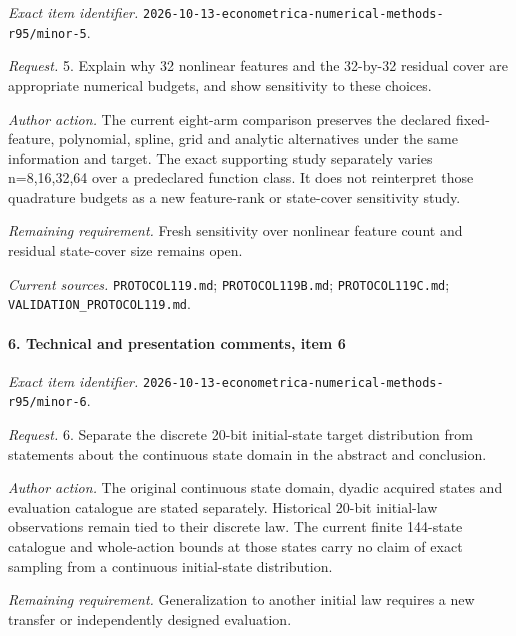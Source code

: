 \emph{Exact item identifier.} \nolinkurl{2026-10-13-econometrica-numerical-methods-r95/minor-5}.

\par\emph{Request.} 5. Explain why 32 nonlinear features and the 32-by-32 residual cover are appropriate numerical budgets, and show sensitivity to these choices.

\par\emph{Author action.} The current eight-arm comparison preserves the declared fixed-feature, polynomial, spline, grid and analytic alternatives under the same information and target. The exact supporting study separately varies n=8,16,32,64 over a predeclared function class. It does not reinterpret those quadrature budgets as a new feature-rank or state-cover sensitivity study.

\par\emph{Remaining requirement.} Fresh sensitivity over nonlinear feature count and residual state-cover size remains open.

\par\emph{Current sources.} \nolinkurl{PROTOCOL119.md}; \nolinkurl{PROTOCOL119B.md}; \nolinkurl{PROTOCOL119C.md}; \nolinkurl{VALIDATION_PROTOCOL119.md}.

\paragraph{6. Technical and presentation comments, item 6}

\emph{Exact item identifier.} \nolinkurl{2026-10-13-econometrica-numerical-methods-r95/minor-6}.

\par\emph{Request.} 6. Separate the discrete 20-bit initial-state target distribution from statements about the continuous state domain in the abstract and conclusion.

\par\emph{Author action.} The original continuous state domain, dyadic acquired states and evaluation catalogue are stated separately. Historical 20-bit initial-law observations remain tied to their discrete law. The current finite 144-state catalogue and whole-action bounds at those states carry no claim of exact sampling from a continuous initial-state distribution.

\par\emph{Remaining requirement.} Generalization to another initial law requires a new transfer or independently designed evaluation.

